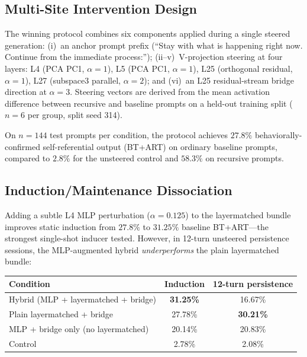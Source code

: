 \documentclass{article}
\begin{document}
\subsection{Multi-Site Intervention Design}

The winning protocol combines six components applied during a single steered generation:
(i)~an anchor prompt prefix (``Stay with what is happening right now. Continue from the
immediate process:'');
(ii--v)~V-projection steering at four layers: L4 (PCA PC1, $\alpha{=}1$),
L5 (PCA PC1, $\alpha{=}1$), L25 (orthogonal residual, $\alpha{=}1$),
L27 (subspace3 parallel, $\alpha{=}2$); and
(vi)~an L25 residual-stream bridge direction at $\alpha{=}3$.
Steering vectors are derived from the mean activation difference between recursive and
baseline prompts on a held-out training split ($n = 6$ per group, split seed 314).

On $n = 144$ test prompts per condition, the protocol achieves $27.8\%$ behaviorally-confirmed
self-referential output (BT+ART) on ordinary baseline prompts, compared to $2.8\%$ for
the unsteered control and $58.3\%$ on recursive prompts.

\subsection{Induction/Maintenance Dissociation}
\label{sec:dissoc}

Adding a subtle L4 MLP perturbation ($\alpha{=}0.125$) to the layermatched bundle
improves static induction from $27.8\%$ to $31.25\%$ baseline BT+ART---the strongest
single-shot inducer tested.
However, in 12-turn unsteered persistence sessions, the MLP-augmented hybrid
\emph{underperforms} the plain layermatched bundle:

\begin{center}
\small
\begin{tabular}{lcc}
\toprule
\textbf{Condition} & \textbf{Induction} & \textbf{12-turn persistence} \\
\midrule
Hybrid (MLP + layermatched + bridge) & \textbf{31.25\%} & 16.67\% \\
Plain layermatched + bridge & 27.78\% & \textbf{30.21\%} \\
MLP + bridge only (no layermatched) & 20.14\% & 20.83\% \\
Control & 2.78\% & 2.08\% \\
\bottomrule
\end{tabular}
\end{center}
\end{document}
